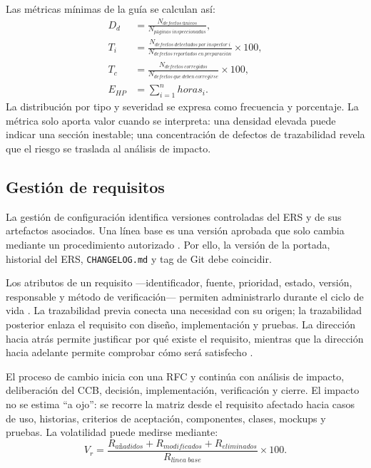 \documentclass[11pt,a4paper]{article}
\begin{document}
	Las métricas mínimas de la guía se calculan así:
	\begin{align}
		D_d &= \frac{N_{defectos\ únicos}}{N_{páginas\ inspeccionadas}},\\
		T_i &= \frac{N_{defectos\ detectados\ por\ inspector\ i}}{N_{defectos\ reportados\ en\ preparación}}\times 100,\\
		T_c &= \frac{N_{defectos\ corregidos}}{N_{defectos\ que\ deben\ corregirse}}\times 100,\\
		E_{HP} &= \sum_{i=1}^{n} horas_i.
	\end{align}
	La distribución por tipo y severidad se expresa como frecuencia y porcentaje. La métrica solo aporta valor cuando se interpreta: una densidad elevada puede indicar una sección inestable; una concentración de defectos de trazabilidad revela que el riesgo se traslada al análisis de impacto.
	
	\subsection{Gestión de requisitos}
	La gestión de configuración identifica versiones controladas del ERS y de sus artefactos asociados. Una línea base es una versión aprobada que solo cambia mediante un procedimiento autorizado \cite{iso15288,iso12207}. Por ello, la versión de la portada, historial del ERS, \texttt{CHANGELOG.md} y tag de Git debe coincidir.
	
	Los atributos de un requisito ---identificador, fuente, prioridad, estado, versión, responsable y método de verificación--- permiten administrarlo durante el ciclo de vida \cite{wiegers2013}. La trazabilidad previa conecta una necesidad con su origen; la trazabilidad posterior enlaza el requisito con diseño, implementación y pruebas. La dirección hacia atrás permite justificar por qué existe el requisito, mientras que la dirección hacia adelante permite comprobar cómo será satisfecho \cite{gotel1994,cleland2012}.
	
	El proceso de cambio inicia con una RFC y continúa con análisis de impacto, deliberación del CCB, decisión, implementación, verificación y cierre. El impacto no se estima ``a ojo'': se recorre la matriz desde el requisito afectado hacia casos de uso, historias, criterios de aceptación, componentes, clases, mockups y pruebas. La volatilidad puede medirse mediante:
	\begin{equation}
		V_r=\frac{R_{añadidos}+R_{modificados}+R_{eliminados}}{R_{línea\ base}}\times100.
	\end{equation}
	
\end{document}
